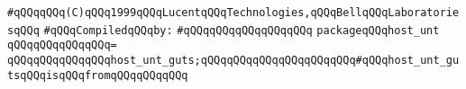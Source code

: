 \label{src/lib/std/host-unt.pkg}
\verb|#qQQqqQQq(C)qQQq1999qQQqLucentqQQqTechnologies,qQQqBellqQQqLaboratoriesqQQq|\newline
\newline
\verb|#qQQqCompiledqQQqby:|\newline
\verb|#qQQqqQQqqQQqqQQqqQQq|\newline
\newline
\verb|packageqQQqhost_unt|\newline
\verb|qQQqqQQqqQQqqQQq=|\newline
\verb|qQQqqQQqqQQqqQQqhost_unt_guts;qQQqqQQqqQQqqQQqqQQqqQQq#qQQqhost_unt_gutsqQQqisqQQqfromqQQqqQQqqQQq|\newline
\newline

